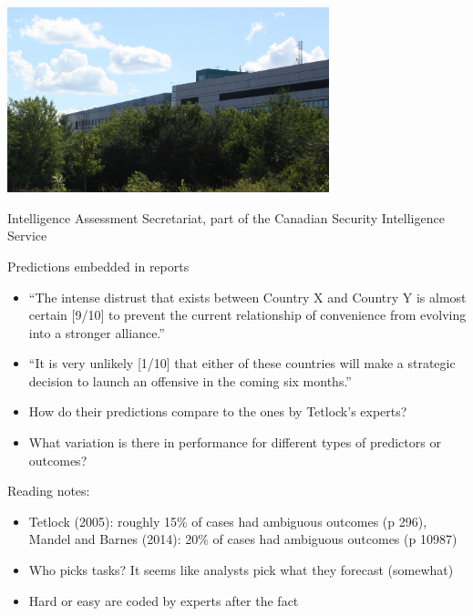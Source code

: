 \documentclass{beamer}
\begin{document}
\begin{frame}

\begin{center}
\includegraphics[width=0.7\textwidth]{figures/CSIS_Ottawa_Building_Ogilvie_Canadian_Security_Intelligence_Service_(50182903412)}
\end{center}

\vfill
Intelligence Assessment Secretariat, part of the Canadian Security Intelligence Service
\end{frame}
\begin{frame}

Predictions embedded in reports
\begin{itemize}
\item ``The intense distrust that exists between Country X and Country Y is almost certain [9/10] to prevent the current relationship of convenience from evolving into a stronger alliance.''
\item ``It is very unlikely [1/10] that either of these countries will make a strategic decision to launch an offensive in the coming six months.''
\end{itemize}

\end{frame}
\begin{frame}

\begin{itemize}
\item How do their predictions compare to the ones by Tetlock's experts?
\pause
\item What variation is there in performance for different types of predictors or outcomes?
\end{itemize}

\end{frame}
\begin{frame}

Reading notes:
\begin{itemize}
\item Tetlock (2005): roughly 15\% of cases had ambiguous outcomes (p 296), Mandel and Barnes (2014): 20\% of cases had ambiguous outcomes (p 10987)
\pause
\item Who picks tasks?  It seems like analysts pick what they forecast (somewhat)
\pause
\item Hard or easy are coded by experts after the fact
\end{itemize}

\end{frame}
\end{document}
